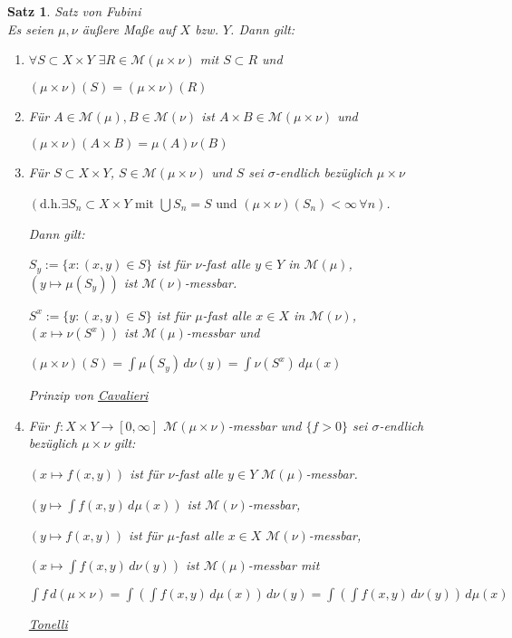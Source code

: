 \documentclass[11pt]{memoir}
\theoremstyle{changebreak}
\newtheorem{Satz}{Satz}[chapter]
\begin{document}
\begin{Satz}
\emph{Satz von Fubini} \\
Es seien $\mu, \nu$ äußere Maße auf $X$ bzw. $Y$. Dann gilt:
\begin{enumerate}
	\item $\forall S \subset X \times Y$ $\exists R \in \mathscr M(\mu \times \nu)$ mit $S \subset R$ und
	\begin{center}
		$(\mu \times \nu)(S) = (\mu \times \nu)(R)$
	\end{center}
	\item Für $A \in \mathscr M(\mu), B \in \mathscr M(\nu)$ ist $A \times B \in \mathscr M(\mu \times \nu)$ und
	\begin{center}
		$(\mu \times \nu)(A \times B) = \mu(A)\nu(B)$
	\end{center}
	\item Für $S \subset X \times Y$, $S \in \mathscr M(\mu \times \nu)$ und $S$ sei $\sigma$-endlich bezüglich $\mu \times \nu$
	\par
	$\left(\text{d.h.} \exists S_n \subset X \times Y \text{ mit }\bigcup S_n = S\text{ und }(\mu \times \nu)(S_n) < \infty \,\forall n\right)$.
	\par
	Dann gilt:
	\par
	$S_y := \{x: (x, y) \in S\}$ ist für $\nu$-fast alle $y \in Y$ in $\mathscr M(\mu)$, \\
	$(y \mapsto \mu(S_y))$ ist $\mathscr M(\nu)$-messbar. \\
	\par
	$S^x := \{y : (x, y) \in S\}$ ist für $\mu$-fast alle $x \in X$ in $\mathscr M(\nu)$, \\
	$(x \mapsto \nu(S^x))$ ist $\mathscr M(\mu)$-messbar und
	\begin{center}
		$(\mu \times \nu)(S) = \int \mu(S_y)\, d\nu(y) = \int \nu(S^x) \, d\mu(x)$ \\
	\end{center}
	\emph{Prinzip von \underline{Cavalieri}}

	\item Für $f: X \times Y \rightarrow [0, \infty]$ $\mathscr M(\mu \times \nu)$-messbar und $\{f > 0\}$ sei $\sigma$-endlich bezüglich $\mu \times \nu$ gilt:
	\par
	$(x \mapsto f(x, y))$ ist für $\nu$-fast alle $y \in Y$ $\mathscr M(\mu)$-messbar.
	\par
	$\left(y \mapsto \int f(x, y) \, d\mu(x)\right) $ ist $\mathscr M(\nu)$-messbar,
	\par
	$(y \mapsto f(x, y))$ ist für $\mu$-fast alle $x \in X$ $\mathscr M(\nu)$-messbar,
	\par
	$\left( x \mapsto \int f(x, y) \, d\nu(y)\right)$ ist $\mathscr M(\mu)$-messbar mit
	\begin{center}
		$\int f \, d(\mu \times \nu) = \int \left( \int f(x, y) \, d\mu(x) \right) \, d\nu(y) = \int \left( \int f(x, y) \, d\nu(y) \right) \, d\mu(x)$ \\
	\end{center}
	\emph{\underline{Tonelli}}


\end{enumerate}
\end{Satz}
\end{document}
